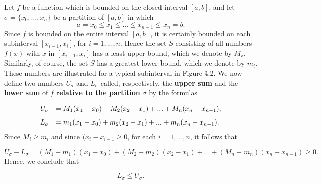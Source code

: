 Let $f$ be a function which is bounded on the closed interval $[a, b]$, and let $\sigma =\{ x_0, . . ., x_n \}$ be a partition of $[a, b]$ in which
$$
a = x_0 \leq x_1 \leq ... \leq x_{n-1} \leq x_n = b.
$$
Since $f$ is bounded on the entire interval $[a, b]$, it is certainly bounded on each
subinterval $[x_{i - 1},  x_i]$, for $i = 1, . . ., n$. Hence the set $S$ consisting of all numbers $f(x)$ with $x$ in $[x_{i-1}, x_i]$ has a least upper bound, which we denote by $M_i$. Similarly, of course, the set $S$ has a greatest lower bound, which we denote by $m_i$. These numbers are illustrated for a typical subinterval in Figure \f{4.2}. We now define two numbers $U_{\sigma}$ and $L_{\sigma}$ called, respectively, the \textbf{upper sum} and the \textbf{lower sum} of $f$ \textbf{relative to the partition} $\sigma$ by the formulas


\begin{equation}
\begin{array}{ll}
U_\sigma &= M_{1}(x_1- x_0) + M_{2}(x_2 - x_1) + ... + M_{n}(x_{n} - x_{n-1}), \vspace{.1in}\\
L_\sigma &= m_{1}(x_1- x_0) + m_{2}(x_2 - x_1) + ... + m_{n}(x_{n} - x_{n-1}).
\end{array}
\label{eq4.1.1}
\end{equation}
\noindent Since $M_i \geq m_i$ and since $(x_i - x_{i-1} \geq 0$, for each $i = 1, . . ., n$, it follows that

$$
U_{\sigma} - L_{\sigma} = (M_1 - m_1) (x_1 - x_0) + (M_2 - m_2) (x_2 - x_1) + ... + (M_n - m_n) (x_n - x_{n-1}) \geq 0.
$$
\noindent Hence, we conclude that

\begin{equation}
L_{\sigma} \leq U_{\sigma}.
\label{eq4.1.2}
\end{equation}

